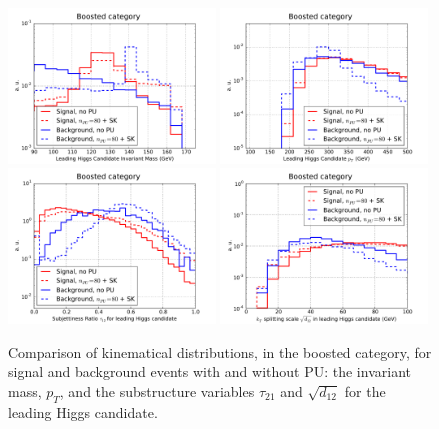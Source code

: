\begin{figure}[t]
  \begin{center}
  \includegraphics[width=0.49\textwidth]{plots/m_h0_bst_comp_back.pdf}
  \includegraphics[width=0.49\textwidth]{plots/pt_h0_bst_comp_back.pdf}
   \includegraphics[width=0.49\textwidth]{plots/tau21_h1_bst_comp_back.pdf}
  \includegraphics[width=0.49\textwidth]{plots/split12_h0_bst_comp_back.pdf}
   \caption{\small
     Comparison of kinematical distributions, in
     the boosted category, for signal and background events
     with and without PU: the invariant mass,  $p_T$,
     and the substructure variables $\tau_{21}$ and $\sqrt{d_{12}}$
    for the leading Higgs candidate.
 }
\label{fig:signal-vs-back-boosted}
\end{center}
\end{figure}



